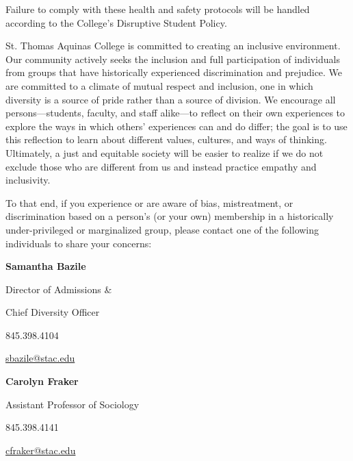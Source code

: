 \documentclass[11pt,letterpaper]{article}
\begin{document}
Failure to comply with these health and safety protocols will be handled according to the College's Disruptive Student Policy.
\sectionbreak




St. Thomas Aquinas College is committed to creating an inclusive environment. Our community actively seeks the inclusion and full participation of individuals from groups that have historically experienced discrimination and prejudice. We are committed to a climate of mutual respect and inclusion, one in which diversity is a source of pride rather than a source of division. We encourage all persons---students, faculty, and staff alike---to reflect on their own experiences to explore the ways in which others' experiences can and do differ; the goal is to use this reflection to learn about different values, cultures, and ways of thinking. Ultimately, a just and equitable society will be easier to realize if we do not exclude those who are different from us and instead practice empathy and inclusivity. \pspace

To that end, if you experience or are aware of bias, mistreatment, or discrimination based on a person's (or your own) membership in a historically under-privileged or marginalized group, please contact one of the following individuals to share your concerns: \pspace

        \hfill\begin{minipage}[t]{0.45\textwidth}
        {\bfseries Samantha Bazile} \par
        Director of Admissions \& \par
        Chief Diversity Officer \par
        845.398.4104 \par
        \href{mailto:sbazile@stac.edu}{sbazile@stac.edu}
        \end{minipage}\begin{minipage}[t]{0.45\textwidth}
        {\bfseries Carolyn Fraker} \par
        Assistant Professor of Sociology \par
        845.398.4141 \par
        \href{mailto:cfraker@stac.edu}{cfraker@stac.edu}
        \end{minipage} \pspace
        
\end{document}

